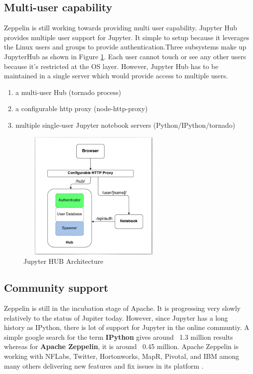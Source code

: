 \documentclass[9pt,twocolumn,twoside]{ ../../styles/osajnl}
\begin{document}
\subsection{Multi-user capability}
Zeppelin is still working towards providing multi user capability. Jupyter Hub \cite{www-jupyterhub} provides multiple user support for Jupyter. It simple to setup because it leverages the Linux users and groups to provide authentication.Three subsystems make up JupyterHub as shown in Figure \ref{fig:jhub}.
Each user cannot touch or see any other users because it's restricted at the OS layer. However, Jupyter Hub has to be maintained in a single server which would provide access to multiple users.
\begin{enumerate}
     \item a multi-user Hub (tornado process)
     \item a configurable http proxy (node-http-proxy)
     \item multiple single-user Jupyter notebook servers (Python/IPython/tornado) 
\end{enumerate}
\begin{figure}[h]
\begin{center}
\includegraphics[width =3in,height=2.5in]{images/jhub}
\caption{Jupyter HUB Architecture \cite{www-jupyterhub}}
\label{fig:jhub}
\end{center}
\end{figure}

\subsection{Community support}

Zeppelin is still in the incubation stage of Apache. It is progressing very slowly relatively to the status of Jupiter today. However, since Jupyter has a long history as IPython, there is lot of support for Jupyter in the online communtiy. A simple google search for the term \textbf{IPython} gives around ~1.3 million results whereas for \textbf{Apache Zeppelin}, it is around ~0.45 million. Apache Zeppelin is working with NFLabs, Twitter, Hortonworks, MapR, Pivotal, and IBM among many others delivering new features and fix issues in its platform \cite{www-horton-zeppelin}.
\end{document}
